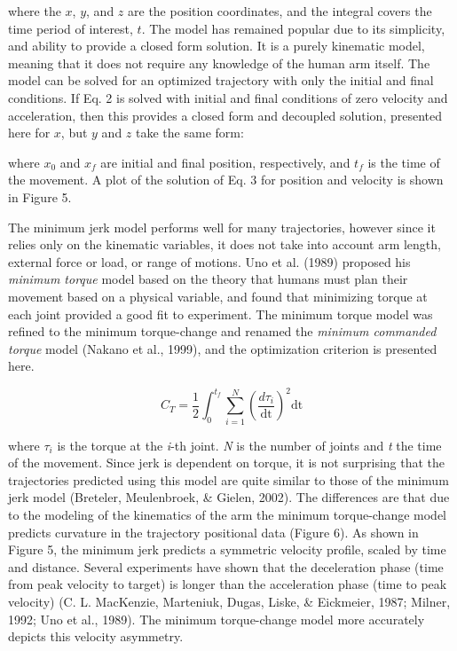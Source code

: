 where the \(x\), \(y\), and \(z\) are the position coordinates, and the integral covers the time period of interest, \(t\). The model has remained popular due to its simplicity, and ability to provide a closed form solution. It is a purely kinematic model, meaning that it does not require any knowledge of the human arm itself. The model can be solved for an optimized trajectory with only the initial and final conditions.  If Eq. 2 is solved with initial and final conditions of zero velocity and acceleration, then this provides a closed form and decoupled solution, presented here for \(x\), but \(y\) and \(z\) take the same form:


where \(x_{0}\) and \(x_{f}\) are initial and final position, respectively, and \(t_{f}\) is the time of the movement. A plot of the solution of Eq. 3 for position and velocity is shown in Figure 5.

The minimum jerk model performs well for many trajectories, however since it relies only on the kinematic variables, it does not take into account arm length, external force or load, or range of motions. Uno et al. (1989) proposed his \emph{minimum torque} model based on the theory that humans must plan their movement based on a physical variable, and found that minimizing torque at each joint provided a good fit to experiment. The minimum torque model was refined to the minimum torque-change and renamed the \emph{minimum commanded torque} model (Nakano et al., 1999), and the optimization criterion is presented here.

\[C_{T} = \frac{1}{2}\int_{0}^{t_{f}}{\sum_{i = 1}^{N}{\left( \frac{d\tau_{i}}{\text{dt}} \right)^{2}\text{dt}}}\]

where \(\tau_{i}\) is the torque at the \emph{i}-th joint. \emph{N} is the number of joints and \emph{t} the time of the movement. Since jerk is dependent on torque, it is not surprising that the trajectories predicted using this model are quite similar to those of the minimum jerk model (Breteler, Meulenbroek, \& Gielen, 2002). The differences are that due to the modeling of the kinematics of the arm the minimum torque-change model predicts curvature in the trajectory positional data (Figure 6). As shown in Figure 5, the minimum jerk predicts a symmetric velocity profile, scaled by time and distance. Several experiments have shown that the deceleration phase (time from peak velocity to target) is longer than the acceleration phase (time to peak velocity) (C. L.  MacKenzie, Marteniuk, Dugas, Liske, \& Eickmeier, 1987; Milner, 1992; Uno et al., 1989). The minimum torque-change model more accurately depicts this velocity asymmetry.

